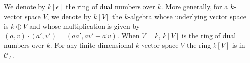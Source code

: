 \medskip\noindent
We denote by $k[\epsilon]$ the ring of dual numbers over $k$.  More
generally, for a $k$-vector space $V$, we denote by $k[V]$ the $k$-algebra
whose underlying vector space is $k \oplus V$ and whose multiplication is given
by $(a, v) \cdot (a', v') = (aa', av' + a'v)$.  When $V = k$, $k[V]$ is the ring
of dual numbers over $k$.  For any finite dimensional $k$-vector space $V$
the ring $k[V]$ is in $\mathcal{C}_\Lambda$.
